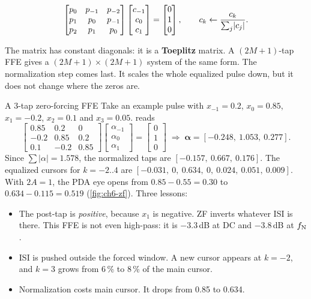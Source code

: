 \begin{keyeq}
\begin{equation}
  \begin{bmatrix}p_{0}&p_{-1}&p_{-2}\\ p_{1}&p_{0}&p_{-1}\\ p_{2}&p_{1}&p_{0}\end{bmatrix}
  \begin{bmatrix}c_{-1}\\ c_0\\ c_1\end{bmatrix}=
  \begin{bmatrix}0\\1\\0\end{bmatrix},
  \qquad c_k\leftarrow\frac{c_k}{\sum_j\lvert c_j\rvert}.
  \label{eq:ch6-zf}
\end{equation}
\end{keyeq}

The matrix has constant diagonals: it is a \textbf{Toeplitz} matrix. A $(2M+1)$-tap FFE gives a $(2M+1)\times(2M+1)$ system of the same form. The normalization step comes last. It scales the whole equalized pulse down, but it does not change where the zeros are.

\begin{example}{A 3-tap zero-forcing FFE}\label{we:ch6-zf}
Take an example pulse with $x_{-1}=0.2$, $x_0=0.85$, $x_1=-0.2$, $x_2=0.1$ and $x_3=0.05$.  reads
\[
\begin{bmatrix}0.85&0.2&0\\-0.2&0.85&0.2\\0.1&-0.2&0.85\end{bmatrix}
\begin{bmatrix}\alpha_{-1}\\\alpha_0\\\alpha_1\end{bmatrix}=\begin{bmatrix}0\\1\\0\end{bmatrix}
\;\Rightarrow\;\boldsymbol\alpha=[-0.248,\ 1.053,\ 0.277].
\]
Since $\sum\lvert\alpha\rvert=1.578$, the normalized taps are $[-0.157,\ 0.667,\ 0.176]$. The equalized cursors for $k=-2..4$ are $[-0.031,\ 0,\ 0.634,\ 0,\ 0.024,\ 0.051,\ 0.009]$. With $2A=1$, the PDA eye opens from $0.85-0.55=0.30$ to $0.634-0.115=0.519$ (\cref{fig:ch6-zf}). Three lessons:
\begin{itemize}
  \item The post-tap is \emph{positive}, because $x_1$ is negative. ZF inverts whatever ISI is there. This FFE is not even high-pass: it is $-3.3$\,dB at DC and $-3.8$\,dB at $f_\mathrm{N}$.
  \item ISI is pushed outside the forced window. A new cursor appears at $k=-2$, and $k=3$ grows from 6\,\% to 8\,\% of the main cursor.
  \item Normalization costs main cursor. It drops from 0.85 to 0.634.
\end{itemize}
\end{example}

